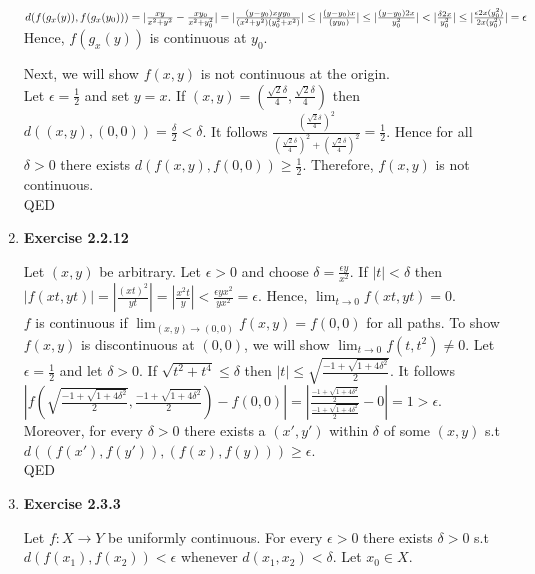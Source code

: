 \documentclass[10pt]{article}
\begin{document}
\begin{enumerate}[label=Problem \arabic*.]
\begin{minipage}{0.5\textwidth}
            $d(f(g_x(y)),f(g_x(y_0)))=|\frac{xy}{x^2+y^2}-\frac{xy_0}{x^{2}+y_{0}^2}|\\
            =|\frac{(y-y_0)xyy_0}{(x^2+y^2)(y_{0}^{2}+x^2)}|\le |\frac{(y-y_0)x}{(yy_{0})}|\\
            \le |\frac{(y-y_0)2x}{y_{0}^{2}}|<|\frac{\delta2x}{y_{0}^{2}}|\le|\frac{\epsilon2x(y_{0}^{2})}{2x(y_{0}^{2})}|=\epsilon$\\
            Hence, $f(g_x(y))$ is continuous at $y_0$. 
        \end{minipage}
        Next, we will show $f(x,y)$ is not continuous at the origin.\\
        Let $\epsilon=\frac{1}{2}$ and set $y=x$.
        If $(x,y)=(\frac{\sqrt{2}\delta}{4},\frac{\sqrt{2}\delta}{4})$ then $d((x,y),(0,0))=\frac{\delta}{2}<\delta$.
        It follows $\frac{(\frac{\sqrt{2}\delta}{4})^2}{(\frac{\sqrt{2}\delta}{4})^2+(\frac{\sqrt{2}\delta}{4})^2}=\frac{1}{2}$.
        Hence for all $\delta>0$ there exists $d(f(x,y),f(0,0))\ge\frac{1}{2}$. Therefore, $f(x,y)$ is not continuous.\\
        QED
    \item \textbf{Exercise 2.2.12}\par 
    Let $(x,y)$ be arbitrary. Let $\epsilon>0$ and choose $\delta=\frac{\epsilon y}{x^2}$.
    If $|t|<\delta$ then $|f(xt,yt)|=|\frac{(xt)^2}{yt}|=|\frac{x^2t}{y}|<\frac{\epsilon yx^2}{yx^2}=\epsilon$. Hence, $\displaystyle{\lim_{t\rightarrow 0}}f(xt,yt)=0$.\\
    $f$ is continuous if $\displaystyle{\lim_{(x,y)\rightarrow (0,0)}}f(x,y)=f(0,0)$ for all paths.
    To show $f(x,y)$ is discontinuous at $(0,0)$, we will show $\displaystyle{\lim_{t\rightarrow 0}}f(t,t^2)\neq 0$. 
    Let $\epsilon=\frac{1}{2}$ and let $\delta>0$.
    If $\sqrt{t^2+t^4}\le \delta$ then $|t|\le\sqrt{\frac{-1+\sqrt{1+4\delta^2}}{2}}$. It follows $|f(\sqrt{\frac{-1+\sqrt{1+4\delta^2}}{2}},\frac{-1+\sqrt{1+4\delta^2}}{2})-f(0,0)|=|\frac{\frac{-1+\sqrt{1+4\delta^2}}{2}}{\frac{-1+\sqrt{1+4\delta^2}}{2}}-0|=1>\epsilon$.\\
    Moreover, for every $\delta>0$ there exists a $(x',y')$ within $\delta$ of some $(x,y)$ s.t $d((f(x'),f(y')),(f(x),f(y)))\ge\epsilon$.\\
    QED
    \item \textbf{Exercise 2.3.3}\par 
    Let $f:X\rightarrow Y$ be uniformly continuous. For every $\epsilon>0$ there exists $\delta>0$ s.t $d(f(x_1),f(x_2))<\epsilon$ whenever $d(x_1,x_2)<\delta$. Let $x_0\in X$. 

\end{enumerate}
\end{document}
